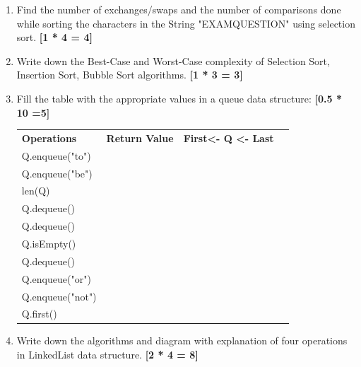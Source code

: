 \documentclass[12pt,a4paper]{article}
\begin{document}
	\begin{enumerate}
		\item Find the number of exchanges/swaps and the number of comparisons done while sorting the characters in the String "EXAMQUESTION" using selection sort.  \hfill\textbf{[1 * 4 = 4] }
		
		\item Write down the Best-Case and Worst-Case complexity of Selection Sort, Insertion Sort, Bubble Sort algorithms. \hfill \textbf{[1 * 3 = 3]}
		
		\item Fill the table with the appropriate values in a queue data structure: \hfill \textbf{ [0.5 *  10 =5]}
		\begin{table}[h]
			\centering
			\begin{tabular}{|l|l|l|l}
				\cline{1-3}
				\textbf{Operations} & \textbf{Return Value} & \textbf{First<- Q <- Last}  &  \\ \cline{1-3}
				Q.enqueue("to") &   &     &  \\ \cline{1-3}
				Q.enqueue("be") &   &     &  \\ \cline{1-3}
				len(Q)&   &     &  \\ \cline{1-3}
				Q.dequeue()&   &     &  \\ \cline{1-3}
				Q.dequeue() &   &     &  \\ \cline{1-3}
				Q.isEmpty() &   &     &  \\ \cline{1-3}
				Q.dequeue() &   &     &  \\ \cline{1-3}
				Q.enqueue("or") &   &     &  \\ \cline{1-3}
				Q.enqueue("not") &   &     &  \\ \cline{1-3}
				Q.first()&   &     &  \\ \cline{1-3}
			\end{tabular}
		\end{table}
	
	\item Write down the algorithms and diagram with explanation of four operations in LinkedList data structure.  \hfill \textbf{[2 * 4 = 8]}
	\end{enumerate}
\end{document}
